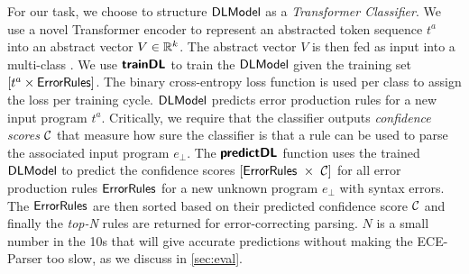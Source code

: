 

%

%
For our task, we choose to structure $\mathsf{DLModel}$ as a \emph{Transformer
Classifier}. We use a novel Transformer encoder to represent an abstracted token
sequence $t^a$ into an abstract vector $V \in \mathbb{R}^k$. The abstract vector $V$ is
then fed as input into a multi-class \dnn. We use $\bm{\mathsf{trainDL}}$ to train the
$\mathsf{DLModel}$ given the training set $[t^a \times \mathsf{ErrorRules}]$. The binary
cross-entropy loss function is used per class to assign the loss per training
cycle. $\mathsf{DLModel}$ predicts error production rules for a new input program $t^a$.
Critically, we require that the classifier outputs \emph{confidence scores}
$\mathcal{C}$ that measure how sure the classifier is that a rule can be used to parse
the associated input program $e_{\bot}$. The $\bm{\mathsf{predictDL}}$ function uses the
trained $\mathsf{DLModel}$ to predict the confidence scores $\List{\errorrulessym\ \times\
\Conf}$ for all error production rules $\mathsf{ErrorRules}$ for a new unknown
program $e_\bot$ with syntax errors. The $\mathsf{ErrorRules}$ are then sorted based
on their predicted confidence score $\mathcal{C}$ and finally the \emph{top-N} rules
are returned for error-correcting parsing. $N$ is a small number in the 10s that
will give accurate predictions without making the ECE-Parser too slow, as we
discuss in \autoref{sec:eval}.
